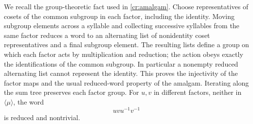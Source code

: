 We recall the group-theoretic fact used in \eqref{cr:amalgam}. Choose representatives of cosets of the common subgroup in each factor, including the identity. Moving subgroup elements across a syllable and collecting successive syllables from the same factor reduces a word to an alternating list of nonidentity coset representatives and a final subgroup element. The resulting lists define a group on which each factor acts by multiplication and reduction; the action obeys exactly the identifications of the common subgroup. In particular a nonempty reduced alternating list cannot represent the identity. This proves the injectivity of the factor maps and the usual reduced-word property of the amalgam. Iterating along the sum tree preserves each factor group. For $u,v$ in different factors, neither in $\langle\mu\rangle$, the word
\begin{equation}\label{cr:commutator}
                            uvu^{-1}v^{-1}
\end{equation}
is reduced and nontrivial.

